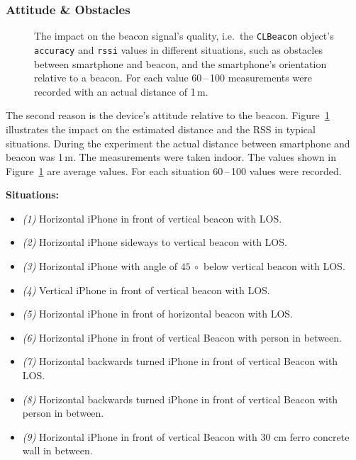\subsubsection*{Attitude \& Obstacles}
\begin{figure}[t]
	
	\caption {The impact on the beacon signal's quality, i.e.\ the \texttt{CLBeacon} object's \texttt{accuracy} and \texttt{rssi} values in different situations, such as obstacles between smartphone and beacon, and the smartphone's orientation relative to a beacon. For each value 60\,--\,100 measurements were recorded with an actual distance of 1\,m.}
	\label{fig:beacon_eval_situations}
\end{figure}

The second reason is the device's attitude relative to the beacon. Figure~\ref{fig:beacon_eval_situations} illustrates the impact on the estimated distance and the \ac{RSS} in typical situations.
During the experiment the actual distance between smartphone and beacon was 1\,m. The measurements were taken indoor. The values shown in Figure~\ref{fig:beacon_eval_situations} are average values. For each situation 60\,--\,100 values were recorded.\newline

\textbf{Situations:}
\begin{itemize}
  \item \emph{(1)} Horizontal iPhone in front of vertical beacon with \acs{LOS}.
  \item \emph{(2)} Horizontal iPhone sideways to vertical beacon with \acs{LOS}.
  \item \emph{(3)} Horizontal iPhone with angle of $45~\circ$ below vertical beacon with \acs{LOS}.
  \item \emph{(4)} Vertical iPhone in front of vertical beacon with \acs{LOS}.
  \item \emph{(5)} Horizontal iPhone in front of horizontal beacon with \acs{LOS}.
  \item \emph{(6)} Horizontal iPhone in front of vertical Beacon with person in between.
  \item \emph{(7)} Horizontal backwards turned iPhone in front of vertical Beacon with \acs{LOS}.
  \item \emph{(8)} Horizontal backwards turned iPhone in front of vertical Beacon with person in between.
  \item \emph{(9)} Horizontal iPhone in front of vertical Beacon with 30 cm ferro concrete wall in between.
\end{itemize}

